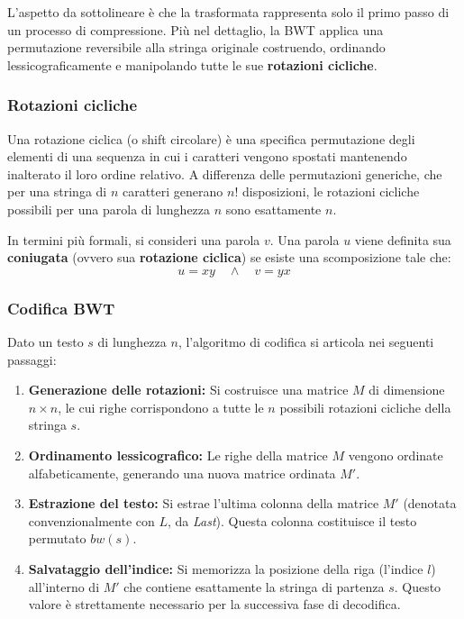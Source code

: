 L'aspetto da sottolineare è che la trasformata rappresenta solo il primo passo di un processo di compressione. Più nel dettaglio, la BWT applica una permutazione reversibile alla stringa originale costruendo, ordinando lessicograficamente e manipolando tutte le sue \textbf{rotazioni cicliche}.

\subsubsection{Rotazioni cicliche}
Una rotazione ciclica (o shift circolare) è una specifica permutazione degli elementi di una sequenza in cui i caratteri vengono spostati mantenendo inalterato il loro ordine relativo. A differenza delle permutazioni generiche, che per una stringa di $n$ caratteri generano $n!$ disposizioni, le rotazioni cicliche possibili per una parola di lunghezza $n$ sono esattamente $n$.

In termini più formali, si consideri una parola $v$. Una parola $u$ viene definita sua \textbf{coniugata} (ovvero sua \textbf{rotazione ciclica}) se esiste una scomposizione tale che:
\[ u = xy \quad \land \quad v = yx \]
\begin{center}
    
\end{center}

\subsubsection{Codifica BWT}
Dato un testo $s$ di lunghezza $n$, l'algoritmo di codifica si articola nei seguenti passaggi:

\begin{enumerate}
    \item \textbf{Generazione delle rotazioni:} Si costruisce una matrice $M$ di dimensione $n \times n$, le cui righe corrispondono a tutte le $n$ possibili rotazioni cicliche della stringa $s$.
    \item \textbf{Ordinamento lessicografico:} Le righe della matrice $M$ vengono ordinate alfabeticamente, generando una nuova matrice ordinata $M'$.
    \item \textbf{Estrazione del testo:} Si estrae l'ultima colonna della matrice $M'$ (denotata convenzionalmente con $L$, da \textit{Last}). Questa colonna costituisce il testo permutato $bw(s)$.
    \item \textbf{Salvataggio dell'indice:} Si memorizza la posizione della riga (l'indice $l$) all'interno di $M'$ che contiene esattamente la stringa di partenza $s$. Questo valore è strettamente necessario per la successiva fase di decodifica.
\end{enumerate}

